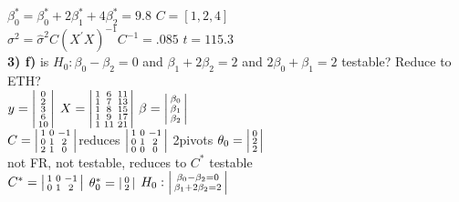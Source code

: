 \documentclass[10pt,landscape]{article}
\newenvironment{lsmallmatrix}
{\left|\begin{smallmatrix}}
	{\end{smallmatrix}\right|}
\newcommand{\B}{\beta}
\newcommand{\sg}{\sigma}
\begin{document}
\begin{multicols*}{4}
$\B_0^*=\B_0^*+2\B_1^*+4\B_2^*=9.8$ $C=[1,2,4]$\\
$\sg^2=\hat{\sg}^2C(X^{'}X)^{-1}C^{-1}=.085$ $t=115.3$\\
\textbf{3) f)} is $H_0: \B_0-\B_2=0$ and $\B_1+2\B_2=2$ and $2\B_0+\B_1=2$ testable? Reduce to ETH?\\
$y=\begin{lsmallmatrix}
0\\2\\3\\6\\10
\end{lsmallmatrix}$ 
$X=\begin{lsmallmatrix}
1&6&11\\
1&7&13\\
1&8&15\\
1&9&17\\
1&11&21
\end{lsmallmatrix}$
$\B=\begin{lsmallmatrix}
\B_0 \\ \B_1 \\ \B_2
\end{lsmallmatrix}$\\
$C=\begin{lsmallmatrix}
1&0&-1\\
0&1&2\\
2&1&0
\end{lsmallmatrix}$reduces $\begin{lsmallmatrix}
1&0&-1\\
0&1&2\\
0&0&0
\end{lsmallmatrix}$ 2pivots $\theta_0=\begin{lsmallmatrix}
0\\2\\2
\end{lsmallmatrix}$\\
not FR, not testable, reduces to $C^*$ testable\\
$C^*=\begin{lsmallmatrix}
1&0&-1\\
0&1&2
\end{lsmallmatrix}$ $\theta^*_0=
\begin{lsmallmatrix}
0\\2
\end{lsmallmatrix}$ $H_0:\begin{lsmallmatrix}
\B_0-\B_2=0\\
\B_1+2\B_2=2
\end{lsmallmatrix}$\\

\end{multicols*}
\end{document}
